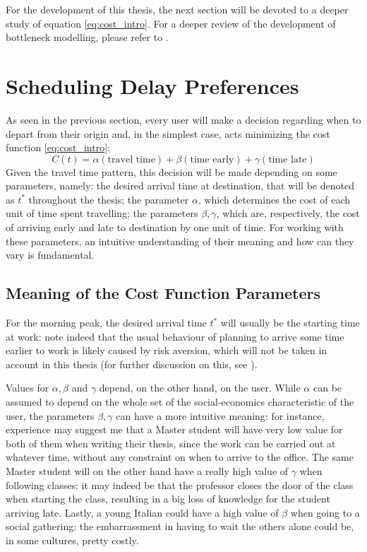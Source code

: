 For the development of this thesis,
the next section will be devoted to a deeper study of equation \eqref{eq:cost_intro}.
For a deeper review of the development of bottleneck modelling, please refer to \cite{LI2020311}.

\section{Scheduling Delay Preferences}

As seen in the previous section, every user will make a decision regarding when to depart from their origin and,
in the simplest case, acts minimizing the cost function \eqref{eq:cost_intro}:
\begin{equation*}
  C(t) = \alpha(\text{travel time}) + \beta (\text{time early}) + \gamma (\text{time late})
\end{equation*}
Given the travel time pattern, this decision will be made depending on some parameters, namely:
the desired arrival time at destination, that will be denoted as \(t^*\) throughout the thesis;
the parameter \(\alpha\), which determines the cost of each unit of time spent travelling;
the parameters \(\beta, \gamma\), which are, respectively,
the cost of arriving early and late to destination by one unit of time.
For working with these parameters, an intuitive understanding of their meaning and how can they vary is fundamental.

\subsection{Meaning of the Cost Function Parameters}

For the morning peak, the desired arrival time \(t^*\) will usually be the starting time at work:
note indeed that the usual behaviour of planning to arrive some time earlier to work is likely caused by risk aversion, which will not be taken in account in this thesis (for further discussion on this, see \cite{doi:10.1177/0361198118792336}).

Values for \(\alpha, \beta\) and \(\gamma\) depend, on the other hand, on the user.
While \(\alpha\) can be assumed to depend on the whole set of the social-economics characteristic of the user,
the parameters \(\beta, \gamma\) can have a more intuitive meaning:
for instance, experience may suggest me that a Master student will have very low value for both of them when writing their thesis, since the work can be carried out at whatever time, without any constraint on when to arrive to the office.
The same Master student will on the other hand have a really high value of \(\gamma\) when following classes:
it may indeed be that the professor closes the door of the class when starting the class, resulting in a big loss of knowledge for the student arriving late.
Lastly, a young Italian could have a high value of \(\beta\) when going to a social gathering:
the embarrassment in having to wait the others alone could be, in some cultures, pretty costly.

